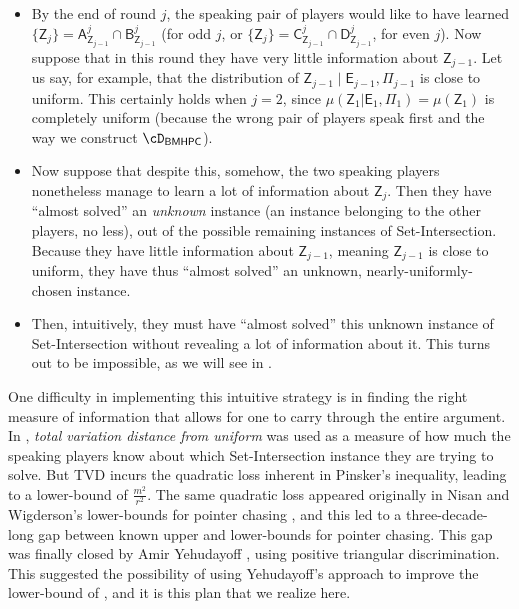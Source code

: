 \documentclass[11pt,letterpaper]{article}
\theoremstyle{definition}
\newcommand{\rPi}{\rv{\Pi}}
\newcommand{\bmhpc}{\ensuremath{\textnormal{\textsf{BMHPC}}}\xspace}
\newcommand{\rA}{\rv{A}}
\newcommand{\rB}{\rv{B}}
\newcommand{\rC}{\rv{C}}
\newcommand{\rD}{\rv{D}}
\newcommand{\rv}[1]{\ensuremath{\mathsf{#1}}}
\newcommand{\rZ}{\rv{Z}}
\newcommand{\rE}{\rv{E}}
\begin{document}
\begin{itemize}
  \item
      By the end of round $j$, the speaking pair of players would like to
      have learned $\{\rZ_{j} \} = \rA^j_{\rZ_{j-1}} \cap \rB^j_{\rZ_{j-1}}$
      (for odd $j$, or $\{\rZ_{j} \} = \rC^j_{\rZ_{j-1}} \cap \rD^j_{\rZ_{j-1}}$,
      for even $j$).
      Now suppose that in this round they have very little information about
      $\rZ_{j-1}$.
      Let us say, for example, that the distribution of
      $\rZ_{j-1} \mid \rE_{j-1}, \rPi_{j-1}$ is close to uniform.
      This certainly holds when $j = 2$, since
      $\mu(\rZ_1 | \rE_1, \rPi_1) = \mu(\rZ_1)$ is
      completely uniform (because the wrong pair of players speak first and the
      way we construct $\cD_\bmhpc$).
    


  \item Now suppose that despite this, somehow, the two speaking players
    nonetheless manage to learn a lot of information about $\rZ_{j}$. Then they
    have ``almost solved'' an \textit{unknown} instance (an instance belonging
    to the other players, no less), out of the possible remaining instances of
    Set-Intersection.
    Because they have little information about $\rZ_{j-1}$,
    meaning $\rZ_{j-1}$ is close to uniform, they have thus ``almost solved'' an
    unknown, nearly-uniformly-chosen instance. 

  \item Then, intuitively, they must have ``almost solved'' this unknown instance of Set-Intersection without revealing a lot of information about it. This turns out to be impossible, as we will see in . 
\end{itemize}


One difficulty in implementing this intuitive strategy is in finding the right measure of information that allows for one to carry through the entire argument. In \cite{AssadiCK19}, \textit{total variation distance from uniform} was used as a measure of how much the speaking players know about which Set-Intersection instance they are trying to solve. But TVD incurs the quadratic loss inherent in Pinsker's inequality, leading to a lower-bound of $\frac{m^2}{r^2}$. The same quadratic loss appeared originally in Nisan and Wigderson's lower-bounds for pointer chasing \cite{NisanW93}, and this led to a three-decade-long gap between known upper and lower-bounds for pointer chasing. This gap was finally closed by Amir Yehudayoff \cite{Yehudayoff20}, using positive triangular discrimination. This suggested the possibility of using Yehudayoff's approach to improve the lower-bound of \cite{AssadiCK19}, and it is this plan that we realize here.
\end{document}
